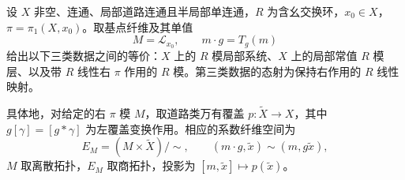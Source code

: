 \begin{theorem}\label{g2:thm:local-system-classification}
	设 \(X\) 非空、连通、局部道路连通且半局部单连通，\(R\) 为含幺交换环，\(x_0\in X\)，\(\pi=\pi_1(X,x_0)\)。取基点纤维及其单值
	\begin{equation}\label{g2:eq:local-right-action}
		M=\mathcal L_{x_0},\qquad m\cdot g=T_g(m)
	\end{equation}
	给出以下三类数据之间的等价：\(X\) 上的 \(R\) 模局部系统、\(X\) 上的局部常值 \(R\) 模层、以及带 \(R\) 线性右 \(\pi\) 作用的 \(R\) 模。第三类数据的态射为保持右作用的 \(R\) 线性映射。

	具体地，对给定的右 \(\pi\) 模 \(M\)，取道路类万有覆盖 \(p:\widetilde X\to X\)，其中 \(g[\gamma]=[g*\gamma]\) 为左覆盖变换作用。相应的系数纤维空间为
	\begin{equation}\label{g2:eq:associated-local-system}
		E_M=(M\times\widetilde X)/{\sim},\qquad(m\cdot g,\widetilde x)\sim(m,g\widetilde x),
	\end{equation}
	\(M\) 取离散拓扑，\(E_M\) 取商拓扑，投影为 \([m,\widetilde x]\mapsto p(\widetilde x)\)。
\end{theorem}
